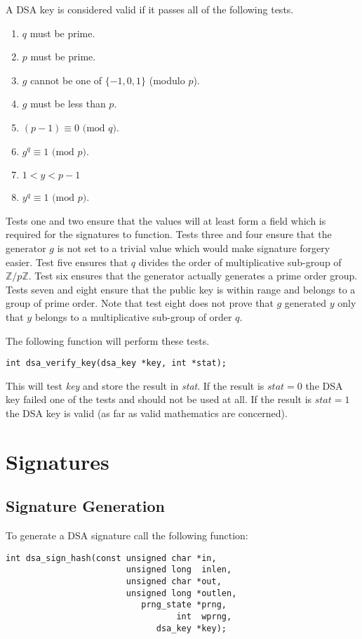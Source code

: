 \documentclass[synpaper]{book}
\def\Z{{\mathbb Z}}
\newcommand{\mysection}[1]    %
	{                   %
	\section{#1}
   \markboth{\textsf{www.libtom.net}}{\thesection ~ {#1}}
	}
\begin{document}
A DSA key is considered valid if it passes all of the following tests.

\begin{enumerate}
   \item $q$ must be prime.
   \item $p$ must be prime.
   \item $g$ cannot be one of $\lbrace -1, 0, 1 \rbrace$ (modulo $p$).
   \item $g$ must be less than $p$.
   \item $(p-1) \equiv 0 \mbox{ (mod }q\mbox{)}$.
   \item $g^q \equiv 1 \mbox{ (mod }p\mbox{)}$.
   \item $1 < y < p - 1$
   \item $y^q \equiv 1 \mbox{ (mod }p\mbox{)}$.
\end{enumerate}

Tests one and two ensure that the values will at least form a field which is required for the signatures to
function.  Tests three and four ensure that the generator $g$ is not set to a trivial value which would make signature
forgery easier.  Test five ensures that $q$ divides the order of multiplicative sub-group of $\Z/p\Z$. Test six
ensures that the generator actually generates a prime order group.  Tests seven and eight ensure that the public key
is within range and belongs to a group of prime order.  Note that test eight does not prove that $g$ generated $y$ only
that $y$ belongs to a multiplicative sub-group of order $q$.

The following function will perform these tests.

\begin{verbatim}
int dsa_verify_key(dsa_key *key, int *stat);
\end{verbatim}

This will test \textit{key} and store the result in \textit{stat}.  If the result is $stat = 0$ the DSA key failed one of the tests
and should not be used at all.  If the result is $stat = 1$ the DSA key is valid (as far as valid mathematics are concerned).

\mysection{Signatures}
\subsection{Signature Generation}
To generate a DSA signature call the following function:

\begin{verbatim}
int dsa_sign_hash(const unsigned char *in,
                        unsigned long  inlen,
                        unsigned char *out,
                        unsigned long *outlen,
                           prng_state *prng,
                                  int  wprng,
                              dsa_key *key);
\end{verbatim}
\end{document}
